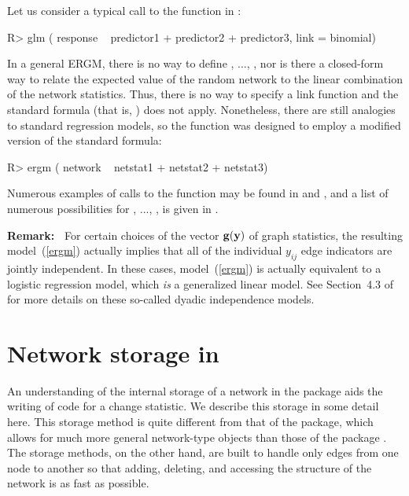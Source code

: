 \documentclass[nojss]{jss}
\def\vec#1{\mathchoice{\mbox{\boldmath$\displaystyle\bf#1$}}
{\mbox{\boldmath$\textstyle\bf#1$}}
{\mbox{\boldmath$\scriptstyle\bf#1$}}
{\mbox{\boldmath$\scriptscriptstyle\bf#1$}}}
\begin{document}
Let us consider a typical call to the  function in :
\begin{CodeChunk}
\begin{CodeInput}
R> glm ( response ~ predictor1 + predictor2 + predictor3, link = binomial)
\end{CodeInput}
\end{CodeChunk}
In a general ERGM, there
is no way to define , ..., ,
nor is there a closed-form way to relate the expected value of the random
network to the linear combination of the network statistics.  Thus, there is
no way to specify a link function and the standard  formula
(that is, ) does not apply.  Nonetheless, there
are still analogies to standard regression models, so the
 function was designed to employ a modified version of the
standard  formula:
\begin{CodeChunk}
\begin{CodeInput}
R> ergm ( network ~ netstat1 + netstat2 + netstat3)
\end{CodeInput}
\end{CodeChunk}
Numerous examples of calls to the  function may be found in
\citet{ergmjss} and \citet{statnettutorialjss}, and a list of numerous possibilities
for , ..., , is given in \citet{ergmtermsjss}.

{\bf Remark:\ }
For certain choices of the vector $\vec g(\vec y)$ of graph statistics, the resulting
model~(\ref{ergm}) actually implies that all of the individual $y_{ij}$ edge indicators
are jointly independent.  In these cases, model~(\ref{ergm}) is actually equivalent
to a logistic regression model, which {\em is} a generalized linear model.
See Section~4.3 of \cite{ergmjss} for more details on these so-called
dyadic independence models.

\section[Network storage in ergm]{Network storage in }
\label{networkstorage}

An understanding of the internal storage of a network in the  package aids the writing of code for a change statistic. We describe this storage in some detail here.
This storage method is quite different from that of the  package,
which allows for much more general network-type objects
than those of the  package \citep{networkjss}.
The  storage methods, on the other hand, are built to
handle only edges from one node to another
so that adding, deleting, and accessing the structure of the network is as
fast as possible.
\end{document}
